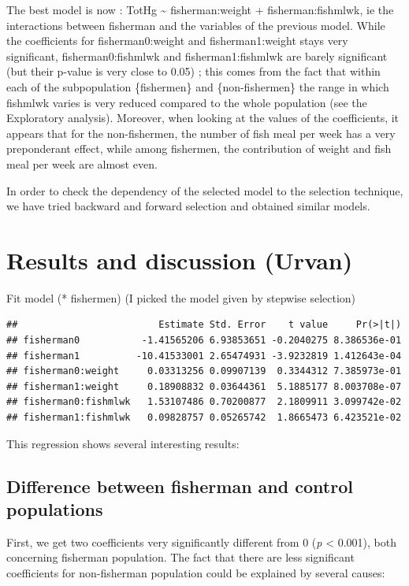 \documentclass[12pt,]{article}
\begin{document}
The best model is now : TotHg \textasciitilde{} fisherman:weight +
fisherman:fishmlwk, ie the interactions between fisherman and the
variables of the previous model. While the coefficients for
fisherman0:weight and fisherman1:weight stays very significant,
fisherman0:fishmlwk and fisherman1:fishmlwk are barely significant (but
their p-value is very close to 0.05) ; this comes from the fact that
within each of the subpopulation \{fishermen\} and \{non-fishermen\} the
range in which fishmlwk varies is very reduced compared to the whole
population (see the Exploratory analysis). Moreover, when looking at the
values of the coefficients, it appears that for the non-fishermen, the
number of fish meal per week has a very preponderant effect, while among
fishermen, the contribution of weight and fish meal per week are almost
even.

In order to check the dependency of the selected model to the selection
technique, we have tried backward and forward selection and obtained
similar models.

\section{Results and discussion
(Urvan)}\label{results-and-discussion-urvan}

Fit model (* fishermen) (I picked the model given by stepwise selection)

\begin{verbatim}
##                         Estimate Std. Error    t value     Pr(>|t|)
## fisherman0           -1.41565206 6.93853651 -0.2040275 8.386536e-01
## fisherman1          -10.41533001 2.65474931 -3.9232819 1.412643e-04
## fisherman0:weight     0.03313256 0.09907139  0.3344312 7.385973e-01
## fisherman1:weight     0.18908832 0.03644361  5.1885177 8.003708e-07
## fisherman0:fishmlwk   1.53107486 0.70200877  2.1809911 3.099742e-02
## fisherman1:fishmlwk   0.09828757 0.05265742  1.8665473 6.423521e-02
\end{verbatim}

This regression shows several interesting results:

\subsection{Difference between fisherman and control
populations}\label{difference-between-fisherman-and-control-populations}

First, we get two coefficients very significantly different from 0
(\emph{p} \textless{} 0.001), both concerning fisherman population. The
fact that there are less significant coefficients for non-fisherman
population could be explained by several causes:
\end{document}
